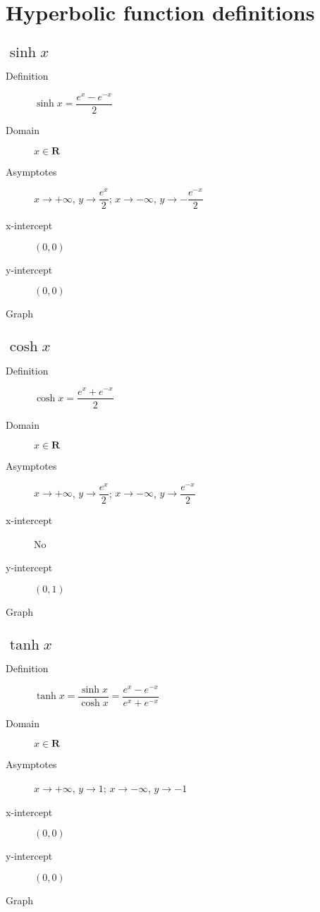 \section{Hyperbolic function definitions}
\subsection{$\sinh x$}
\begin{description}
	\item[Definition] $\sinh x = \dfrac{e^x-e^{-x}}{2}$
	\item[Domain] $x \in \textbf{R}$
	\item[Asymptotes] $x\rightarrow +\infty$, $y\rightarrow\dfrac{e^x}{2}$; $x\rightarrow -\infty$, $y\rightarrow -\dfrac{e^{-x}}{2}$
	\item[x-intercept] $(0,0)$
	\item[y-intercept] $(0,0)$
	\item[Graph]
\end{description}

\subsection{$\cosh x$}
\begin{description}
	\item[Definition] $\cosh x = \dfrac{e^x+e^{-x}}{2}$
	\item[Domain] $x \in \textbf{R}$
	\item[Asymptotes] $x\rightarrow +\infty$, $y\rightarrow\dfrac{e^x}{2}$; $x\rightarrow -\infty$, $y\rightarrow\dfrac{e^{-x}}{2}$
	\item[x-intercept] No
	\item[y-intercept] $(0,1)$
	\item[Graph]
\end{description}

\subsection{$\tanh x$}
\begin{description}
	\item[Definition] $\tanh x = \dfrac{\sinh x}{\cosh x}=\dfrac{e^x-e^{-x}}{e^x+e^{-x}}$
	\item[Domain] $x \in \textbf{R}$
	\item[Asymptotes] $x\rightarrow +\infty$, $y\rightarrow 1$; $x\rightarrow -\infty$, $y\rightarrow -1$
	\item[x-intercept] $(0,0)$
	\item[y-intercept] $(0,0)$
	\item[Graph]
\end{description}

